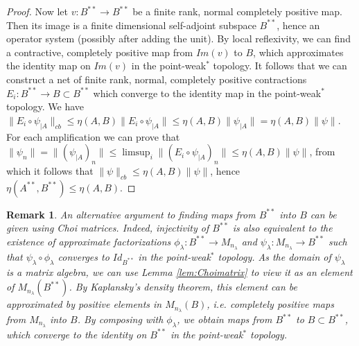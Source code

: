 \documentclass[11pt]{article}
\numberwithin{theorem}{section}
\newtheorem{remark}[theorem]{Remark}
\begin{document}
\begin{proof}
Now let $v: B^{\ast\ast} \to B^{\ast\ast}$ be a finite rank, normal completely positive map. Then its image is a finite dimensional self-adjoint subspace $B^{\ast\ast}$, hence an operator system (possibly after adding the unit). By local reflexivity, we can find a contractive, completely positive map from $Im(v)$ to $B$, which approximates the identity map on $Im(v)$ in the point-weak$^{\ast}$ topology. It follows that we can construct a net of finite rank, normal, completely positive contractions $E_{i}: B^{\ast\ast} \to B \subset B^{\ast\ast}$ which converge to the identity map in the point-weak$^{\ast}$ topology. We have $\|E_{i} \circ \psi_{|A}\|_{cb} \leqslant \eta(A,B) \|E_{i}\circ \psi_{|A}\| \leqslant \eta(A,B) \|\psi_{|A}\| = \eta(A,B) \|\psi\|$. For each amplification we can prove that $\|\psi_n\| = \|(\psi_{|A})_{n}\| \leqslant \limsup_{i} \|(E_{i}\circ \psi_{|A})_{n}\|\leqslant \eta(A,B) \|\psi\| $, from which it follows that $\|\psi\|_{cb} \leqslant \eta(A,B) \|\psi\|$, hence $\eta(A^{\ast\ast}, B^{\ast\ast}) \leqslant \eta(A,B)$. 
\end{proof}
\begin{remark}
An alternative argument to finding maps from $B^{\ast\ast}$ into $B$ can be given using Choi matrices. Indeed, injectivity of $B^{\ast\ast}$ is also equivalent to the existence of approximate factorizations $\phi_{\lambda}: B^{\ast\ast} \to M_{n_{\lambda}}$ and $\psi_{\lambda}: M_{n_{\lambda}}\to B^{\ast\ast}$ such that $\psi_{\lambda} \circ \phi_{\lambda}$ converges to $Id_{B^{\ast\ast}}$ in the point-weak${^\ast}$ topology. As the domain of $\psi_{\lambda}$ is a matrix algebra, we can use Lemma \ref{lem:Choimatrix} to view it as an element of $M_{n_{\lambda}}(B^{\ast\ast})$. By Kaplansky's density theorem, this element can be approximated by positive elements in $M_{n_{\lambda}}(B)$, i.e. completely positive maps from $M_{n_{\lambda}}$ into $B$. By composing with $\phi_{\lambda}$, we obtain maps from $B^{\ast\ast}$ to $B \subset B^{\ast\ast}$, which converge to the identity on $B^{\ast\ast}$ in the point-weak$^{\ast}$ topology.
\end{remark}
\end{document}
